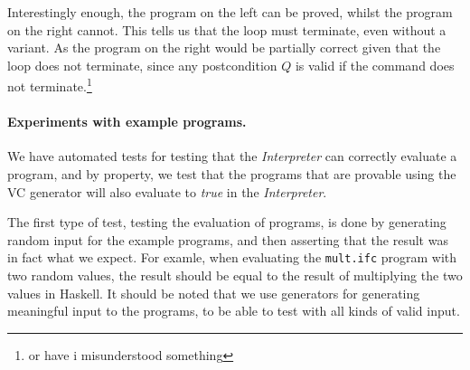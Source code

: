 \begin{itemize}
\begin{minipage}[t]{0.4\textwidth}
\begin{lstlisting}
\end{lstlisting}
\end{minipage}
  Interestingly enough, the program on the left can be proved, whilst the program on the right cannot. This tells us that the loop must terminate, even without a variant. As the program on the right would be partially correct given that the loop does not terminate, since any postcondition $Q$ is valid if the command does not terminate.\footnote{or have i misunderstood something}
\end{itemize}

\paragraph{Experiments with example programs.}
We have automated tests for testing that the \textit{Interpreter} can correctly evaluate a program,
and by property, we test that the programs that are provable using the VC generator will also evaluate to \textit{true} in the \textit{Interpreter}.

The first type of test, testing the evaluation of programs, is done by generating random input for the example programs, and then asserting that the result was in fact what we expect.
For examle, when evaluating the \texttt{mult.ifc} program with two random values, the result should be equal to the result of multiplying the two values in Haskell.
It should be noted that we use generators for generating meaningful input to the programs, to be able to test with all kinds of valid input.

